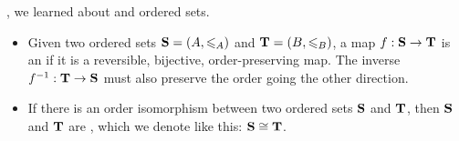 \documentclass[../../../main.tex]{subfiles}
\begin{document}
, we learned about  and  ordered sets.

\begin{itemize}

  \item Given two ordered sets $\struct{S} = (\set{A}, \order/_{\set{A}})$ and $\struct{T} = (\set{B}, \order/_{\set{B}})$, a map $f: \mathbf{S} \rightarrow \mathbf{T}$ is an  if it is a reversible, bijective, order-preserving map. The inverse $f^{-1}: \mathbf{T} \rightarrow \mathbf{S}$ must also preserve the order going the other direction.
  
  \item If there is an order isomorphism between two ordered sets $\mathbf{S}$ and $\mathbf{T}$, then $\mathbf{S}$ and $\mathbf{T}$ are , which we denote like this: $\struct{S} \isomorphic/ \struct{T}$.

\end{itemize}
\end{document}
